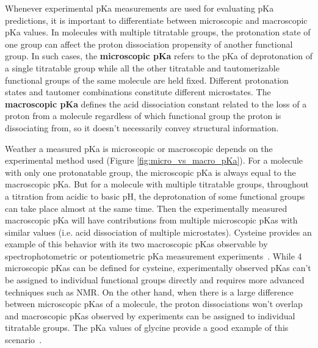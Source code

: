 \documentclass[9pt,lineno]{elife}
\begin{document}
Whenever experimental pKa measurements are used for evaluating pKa predictions, it is important to differentiate between microscopic and macroscopic pKa values. In molecules with multiple titratable groups, the protonation state of one group can affect the proton dissociation propensity of another functional group. In such cases, the \textbf{microscopic pKa} refers to the pKa of deprotonation of a single titratable group while all the other titratable and tautomerizable functional groups of the same molecule are held fixed. Different protonation states and tautomer combinations constitute different microstates. The \textbf{macroscopic pKa} defines the acid dissociation constant related to the loss of a proton from a molecule regardless of which functional group the proton is dissociating from, so it doesn't necessarily convey structural information. 

Weather a measured pKa is microscopic or macroscopic depends on the experimental method used (Figure \ref{fig:micro_vs_macro_pKa}). For a molecule with only one protonatable group, the microscopic pKa is always equal to the macroscopic pKa. But for a molecule with multiple titratable groups, throughout a titration from acidic to basic pH, the deprotonation of some functional groups can take place almost at the same time. Then the experimentally measured macroscopic pKa will have contributions from multiple microscopic pKas with similar values (i.e. acid dissociation of multiple microstates). Cysteine provides an example of this behavior with its two macroscopic pKas observable by spectrophotometric or potentiometric pKa measurement experiments~\citep{darvey_assignment_1995}. While 4 microscopic pKas can be defined for cysteine, experimentally observed pKas can't be assigned to individual functional groups directly and requires more advanced techniques such as NMR. On the other hand, when there is a large difference between microscopic pKas of a molecule, the proton dissociations won't overlap and macroscopic pKas observed by experiments can be assigned to individual titratable groups. The pKa values of glycine provide a good example of this scenario~\citep{darvey_assignment_1995}.
\end{document}
